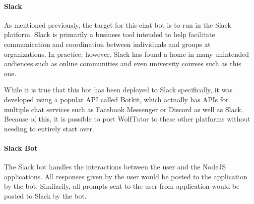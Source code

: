 \paragraph{Slack}
As mentioned previously, the target for this chat bot is to run in the Slack
platform.  Slack is primarily a business tool intended to help facilitate
communication and coordination between individuals and groups at organizations.
In practice, however, Slack has found a home in many unintended audiences such
as online communities and even university courses such as this one.  

While it is true that this bot has been deployed to Slack specifically, it was
developed using a popular API called Botkit, which actually has APIs for
multiple chat services such as Facebook Messenger or Discord as well as Slack.
Because of this, it is possible to port WolfTutor to these other platforms
without needing to entirely start over.

\paragraph{Slack Bot}
The Slack bot handles the interactions between the user and the NodeJS applications. 
All responses given by the user would be posted to the application by the bot. 
Similarily, all prompts sent to the user from application would be posted to Slack by the bot.

